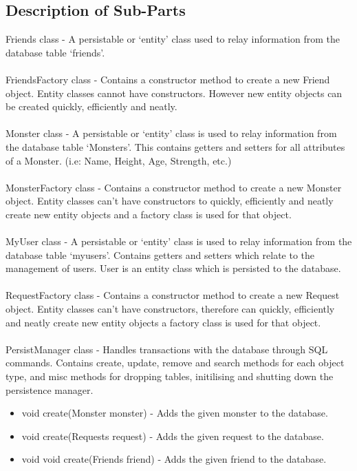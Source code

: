 \documentclass[titlepage]{article}
\begin{document}
{\subsection {Description of Sub-Parts}
Friends class - A persistable or ‘entity’ class used to relay information from the database table ‘friends’.
\\
\\
FriendsFactory class - Contains a constructor method to create a new Friend object. Entity classes cannot have constructors. However new entity objects can be created quickly, efficiently and neatly.
\\
\\
Monster class - A persistable or ‘entity’ class is used to relay information from the database table ‘Monsters’. This contains getters and setters for all attributes of a Monster. (i.e: Name, Height, Age, Strength, etc.)
\\
\\
MonsterFactory class - Contains a constructor method to create a new Monster object. Entity classes can't have constructors to quickly, efficiently and neatly create new entity objects and a factory class is used for that object.
\\
\\
MyUser class - A persistable or ‘entity’ class is used to relay information from the database table ‘myusers’. Contains getters and setters which relate to the management of users. User is an entity class which is persisted to the database.
\\
\\
RequestFactory class - Contains a constructor method to create a new Request object. Entity classes can't have constructors, therefore can quickly, efficiently and neatly create new entity objects a factory class is used for that object.
\\
\\
PersistManager class - Handles transactions with the database through SQL commands. Contains create, update, remove and search methods for each object type, and misc methods for dropping tables, initilising and shutting down the persistence manager.
\begin{itemize}
\item {void create(Monster monster) - Adds the given monster to the database.}
\item {void create(Requests request) - Adds the given request to the database.}
\item {void void create(Friends friend) - Adds the given friend to the database.}

\end{itemize}}
\end{document}
